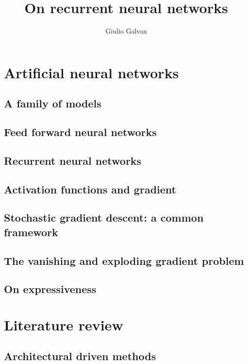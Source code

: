 \documentclass[english,laurea,twoside,10pt]{UFtesi}
\title{On recurrent neural networks}
\author{Giulio Galvan}
\date{}
\theoremstyle{definition}
\theoremstyle{definition}
\theoremstyle{definition}
\begin{document}
\maketitle
\frontmatter

\tableofcontents
\mainmatter
\chapter{Artificial neural networks}
  \section{A family of models}
  
  \section{Feed forward neural networks}
  
  \section{Recurrent neural networks}
  
  \section{Activation functions and gradient}
  
  \section{Stochastic gradient descent: a common framework}
  
  \section{The vanishing and exploding gradient problem}
    \label{sec:vanishing}
    
  \section{On expressiveness}
  \label{sec:expressiveness}
  
\chapter{Literature review}
  
  \section{Architectural driven methods}
  
  
  
  
\end{document}
